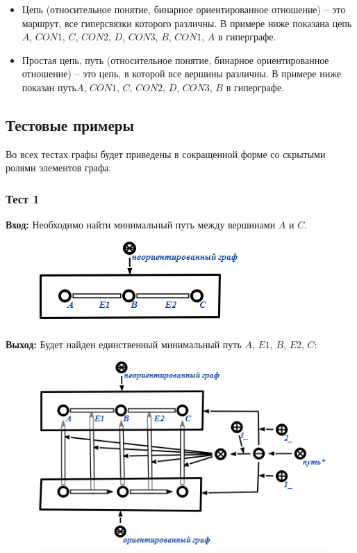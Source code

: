 \begin{itemize}
\item Цепь (относительное понятие, бинарное ориентированное отношение)
  – это маршрут, все гиперсвязки которого различны. В примере ниже
  показана цепь $A$, $CON1$, $C$, $CON2$, $D$, $CON3$, $B$, $CON1$,
  $A$ в гиперграфе.
 
\item Простая цепь, путь (относительное понятие, бинарное
  ориентированное отношение) – это цепь, в которой все вершины
  различны. В примере ниже показан путь$A$, $CON1$, $C$, $CON2$, $D$,
  $CON3$, $B$ в гиперграфе.

\end{itemize}

\subsection{Тестовые примеры}

Во всех тестах графы будет приведены в сокращенной форме со скрытыми
ролями элементов графа.

\newpage

\subsubsection{Тест 1}
\textbf{Вход:}
Необходимо найти минимальный путь между вершинами $A$ и $C$. 

\begin{figure}[h!]
  \centering
  \includegraphics{images/2/test/1_In}
  \label{fig:Test1_In}
\end{figure}

\textbf{Выход:}
Будет найден единственный минимальный путь $A$, $E1$, $B$, $E2$, $C$:

\begin{figure}[h!]
  \centering
  \includegraphics{images/2/test/1_Out}
  \label{fig:Test1_Out}
\end{figure}

